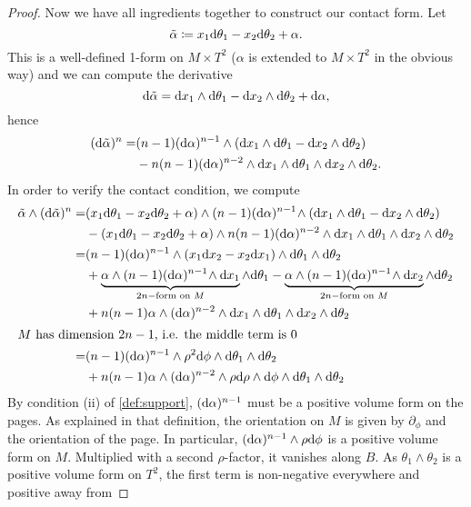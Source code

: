 \begin{proof}
    Now we have all ingredients together to construct our contact form.
    Let
    \[
        \tilde \alpha \coloneqq x_1 \mathrm{d} \theta_1 - x_2 \mathrm{d} \theta_2 + \alpha.
    \]
    This is a well-defined 1-form on $M \times T^2$ ($\alpha$ is extended to $M\times T^2$ in the obvious way) and we can compute the derivative
    \[
        \mathrm{d} \tilde \alpha = \mathrm{d} x_1 \wedge \mathrm{d} \theta_1 - \mathrm{d} x_2 \wedge \mathrm{d} \theta_2 + \mathrm{d} \alpha,
    \]
    hence
    \begin{align*}
        (\mathrm{d} \tilde \alpha)^n =& (n-1)(\mathrm{d} \alpha)^{n-1}\wedge (\mathrm{d} x_1 \wedge \mathrm{d} \theta_1 - \mathrm{d} x_2 \wedge \mathrm{d} \theta_2)\\
        &- n(n-1)(\mathrm{d} \alpha)^{n-2}\wedge \mathrm{d} x_1 \wedge \mathrm{d} \theta_1 \wedge \mathrm{d} x_2 \wedge \mathrm{d} \theta_2.
    \end{align*}
    In order to verify the contact condition, we compute
    \begin{align*}
        \tilde \alpha \wedge (\mathrm{d} \tilde \alpha)^n =& (x_1 \mathrm{d} \theta_1 - x_2 \mathrm{d} \theta_2 + \alpha) \wedge (n-1)(\mathrm{d} \alpha)^{n-1}\!\wedge (\mathrm{d} x_1 \wedge \mathrm{d} \theta_1 - \mathrm{d} x_2 \wedge \mathrm{d} \theta_2)\\
        &- (x_1 \mathrm{d} \theta_1 - x_2 \mathrm{d} \theta_2 + \alpha) \wedge n(n-1)(\mathrm{d} \alpha)^{n-2}\wedge \mathrm{d} x_1 \wedge \mathrm{d} \theta_1 \wedge \mathrm{d} x_2 \wedge \mathrm{d} \theta_2\\
        =& (n-1)(\mathrm{d} \alpha)^{n-1}\wedge(x_1\mathrm{d} x_2 - x_2 \mathrm{d} x_1)\wedge \mathrm{d} \theta_1 \wedge \mathrm{d} \theta_2\\
        &+\underbrace{\alpha\wedge(n-1)(\mathrm{d} \alpha)^{n-1}\!\wedge \mathrm{d} x_1}_{2n-\text{form on } M} \wedge \mathrm{d} \theta_1 - \underbrace{\alpha \wedge (n-1)(\mathrm{d} \alpha)^{n-1}\!\wedge\mathrm{d} x_2}_{2n-\text{form on } M} \wedge \mathrm{d} \theta_2\\
        & + n(n-1)\alpha\wedge(\mathrm{d} \alpha)^{n-2}\wedge \mathrm{d} x_1 \wedge \mathrm{d} \theta_1 \wedge \mathrm{d} x_2 \wedge \mathrm{d} \theta_2\\
        \intertext{$M$ has dimension $2n-1$, i.e. the middle term is 0}
        =& (n-1)(\mathrm{d} \alpha)^{n-1}\wedge \rho^2 \mathrm{d}\phi \wedge \mathrm{d} \theta_1 \wedge \mathrm{d} \theta_2\\
        & + n(n-1)\alpha \wedge (\mathrm{d} \alpha)^{n-2}\wedge \rho \mathrm{d}\rho \wedge \mathrm{d} \phi \wedge \mathrm{d} \theta_1 \wedge \mathrm{d} \theta_2\\
    \end{align*}
    By condition (ii) of \cref{def:support}, $(\mathrm{d} \alpha)^{n-1}$ must be a positive volume form on the pages. As explained in that definition, the orientation on $M$ is given by $\partial_\phi$ and the orientation of the page. In particular, $(\mathrm{d} \alpha)^{n-1} \wedge \rho \mathrm{d} \phi$ is a positive volume form on $M$. Multiplied with a second $\rho$-factor, it vanishes along $B$. As $\theta_1 \wedge \theta_2$ is a positive volume form on $T^2$, the first term is non-negative everywhere and positive away from 

\end{proof}
